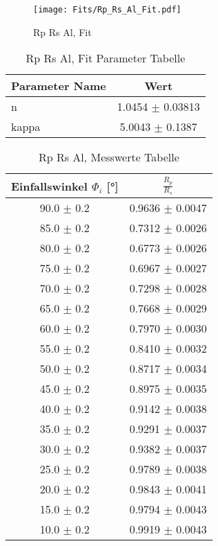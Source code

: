 \begin{figure}[ht] 
 	\centering 
 	\texttt{[image: Fits/Rp\_Rs\_Al\_Fit.pdf]} 
	\caption{Rp Rs Al, Fit} 
 	\label{fig:Rp Rs Al, Fit} 
\end{figure}
 
\begin{table}[ht] 
	\centering 
	\caption{Rp Rs Al, Fit Parameter Tabelle} 
	\label{tab: Rp Rs Al, Fit Parameter Tabelle}
	\begin{tabular}{|l|c|}
		\hline
		Parameter Name	&	Wert \\ \hline
		n	&	 1.0454 $\pm$  0.03813\\ \hline
		kappa	&	 5.0043 $\pm$  0.1387\\ \hline
	\end{tabular} 
\end{table}
 
\begin{table}[ht] 
	\centering 
	\caption{Rp Rs Al, Messwerte Tabelle} 
	\label{tab: Rp Rs Al, Messwerte Tabelle}
	\begin{tabular}{|c|c|}
		\hline
		Einfallswinkel $\Phi_i$ [°] 	&	 $\frac{R_p}{R_s}$\\ \hline
		90.0 $\pm$ 0.2 	&	 0.9636 $\pm$ 0.0047 \\ \hline
		85.0 $\pm$ 0.2 	&	 0.7312 $\pm$ 0.0026 \\ \hline
		80.0 $\pm$ 0.2 	&	 0.6773 $\pm$ 0.0026 \\ \hline
		75.0 $\pm$ 0.2 	&	 0.6967 $\pm$ 0.0027 \\ \hline
		70.0 $\pm$ 0.2 	&	 0.7298 $\pm$ 0.0028 \\ \hline
		65.0 $\pm$ 0.2 	&	 0.7668 $\pm$ 0.0029 \\ \hline
		60.0 $\pm$ 0.2 	&	 0.7970 $\pm$ 0.0030 \\ \hline
		55.0 $\pm$ 0.2 	&	 0.8410 $\pm$ 0.0032 \\ \hline
		50.0 $\pm$ 0.2 	&	 0.8717 $\pm$ 0.0034 \\ \hline
		45.0 $\pm$ 0.2 	&	 0.8975 $\pm$ 0.0035 \\ \hline
		40.0 $\pm$ 0.2 	&	 0.9142 $\pm$ 0.0038 \\ \hline
		35.0 $\pm$ 0.2 	&	 0.9291 $\pm$ 0.0037 \\ \hline
		30.0 $\pm$ 0.2 	&	 0.9382 $\pm$ 0.0037 \\ \hline
		25.0 $\pm$ 0.2 	&	 0.9789 $\pm$ 0.0038 \\ \hline
		20.0 $\pm$ 0.2 	&	 0.9843 $\pm$ 0.0041 \\ \hline
		15.0 $\pm$ 0.2 	&	 0.9794 $\pm$ 0.0043 \\ \hline
		10.0 $\pm$ 0.2 	&	 0.9919 $\pm$ 0.0043 \\ \hline
	\end{tabular} 
\end{table}
 
